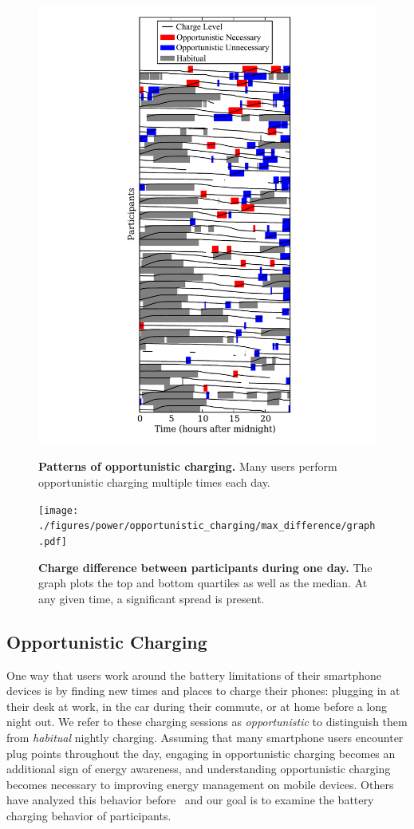 \begin{figure}[th!]

\centering
\includegraphics[width=0.7\columnwidth]{./figures/power/opportunistic_charging/count_and_by_time/graph.pdf}

\caption{\textbf{Patterns of opportunistic charging.} Many users perform
opportunistic charging multiple times each day.}

\label{fig-opportunistic-patterns}

\vspace*{0.2in}

\centering
\texttt{[image: ./figures/power/opportunistic\_charging/max\_difference/graph.pdf]}

\caption{\textbf{Charge difference between participants during one day.} The
graph plots the top and bottom quartiles as well as the median. At any given
time, a significant spread is present.}

\label{fig-opportunistic-spread}

\end{figure}


\subsection{Opportunistic Charging}
\label{subsec-opportunistic}

One way that users work around the battery limitations of their smartphone
devices is by finding new times and places to charge their phones: plugging
in at their desk at work, in the car during their commute, or at home before
a long night out. We refer to these charging sessions as
\textit{opportunistic} to distinguish them from \textit{habitual} nightly
charging. Assuming that many smartphone users encounter plug points
throughout the day, engaging in opportunistic charging becomes an additional
sign of energy awareness, and understanding opportunistic charging becomes
necessary to improving energy management on mobile devices. Others have analyzed
this behavior before~\cite{banerjee:ubicomp:2007, rahmati:mobilehci:2007} and
our goal is to examine the battery charging behavior of \PhoneLab{} participants.

